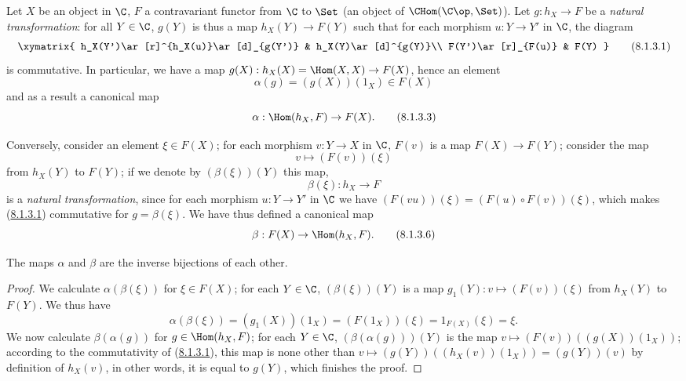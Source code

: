 \begin{env}[8.1.3]
\label{0.8.1.3}
Let $X$ be an object in $\C$, $F$ a contravariant functor from $\C$ to $\Set$
(an object of $\CHom(\C\op,\Set)$). Let $g:h_X\to F$ be a \emph{natural transformation}: for all $Y\in\C$,
$g(Y)$ is thus a map $h_X(Y)\to F(Y)$ such that for each morphism $u:Y\to Y'$ in $\C$,
the diagram
\[
  \xymatrix{
    h_X(Y')\ar[r]^{h_X(u)}\ar[d]_{g(Y')} &
    h_X(Y)\ar[d]^{g(Y)}\\
    F(Y')\ar[r]_{F(u)} &
    F(Y)
  }
  \tag{8.1.3.1}\label{0.8.1.3.1}
\]
is commutative. In particular, we have a map $g(X):h_X(X)=\Hom(X,X)\to F(X)$, hence an element
\[
  \alpha(g)=(g(X))(1_X)\in F(X)
  \tag{8.1.3.2}
\]
and as a result a canonical map
\[
  \alpha:\Hom(h_X,F)\to F(X).
  \tag{8.1.3.3}
\]

Conversely, consider an element $\xi\in F(X)$; for each morphism $v:Y\to X$ in $\C$, $F(v)$ is a
map $F(X)\to F(Y)$; consider the map
\[
  v\mapsto(F(v))(\xi)
  \tag{8.1.3.4}
\]
from $h_X(Y)$ to $F(Y)$; if we denote by $(\beta(\xi))(Y)$ this map,
\[
  \beta(\xi):h_X\to F
  \tag{8.1.3.5}
\]
is a \emph{natural transformation}, since for each morphism $u:Y\to Y'$ in $\C$ we have
$(F(vu))(\xi)=(F(u)\circ F(v))(\xi)$, which makes (\hyperref[0.8.1.3.1]{8.1.3.1}) commutative for $g=\beta(\xi)$.
We have thus defined a canonical map
\[
  \beta:F(X)\to\Hom(h_X,F).
  \tag{8.1.3.6}
\]
\end{env}

\begin{proposition}[8.1.4]
\label{0.8.1.4}
The maps $\alpha$ and $\beta$ are the inverse bijections of each other.
\end{proposition}

\begin{proof}
We calculate $\alpha(\beta(\xi))$ for $\xi\in F(X)$; for each $Y\in\C$, $(\beta(\xi))(Y)$ is a map
$g_1(Y):v\mapsto(F(v))(\xi)$ from $h_X(Y)$ to $F(Y)$. We thus have
\[
  \alpha(\beta(\xi))=(g_1(X))(1_X)=(F(1_X))(\xi)=1_{F(X)}(\xi)=\xi.
\]
We now calculate $\beta(\alpha(g))$ for $g\in\Hom(h_X,F)$; for each $Y\in\C$, $(\beta(\alpha(g)))(Y)$
is the map $v\mapsto(F(v))((g(X))(1_X))$; according to the commutativity of (\hyperref[0.8.1.3.1]{8.1.3.1}), this map
is none other than $v\mapsto(g(Y))((h_X(v))(1_X))=(g(Y))(v)$ by definition of $h_X(v)$, in other words,
it is equal to $g(Y)$, which finishes the proof.
\end{proof}

